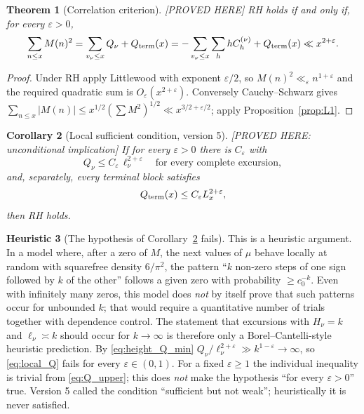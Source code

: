 \documentclass[11pt]{amsart}
\numberwithin{equation}{section}
\theoremstyle{plain}
\newtheorem{theorem}{Theorem}[section]
\newtheorem{corollary}[theorem]{Corollary}
\theoremstyle{definition}
\newtheorem{heuristic}[theorem]{Heuristic}
\theoremstyle{remark}
\newcommand{\eps}{\varepsilon}
\begin{document}
\begin{theorem}[Correlation criterion]
\label{thm:corr-criterion}
\emph{[PROVED HERE]} RH holds if and only if, for every $\eps>0$,
\begin{equation}
\label{eq:RH-corr}
  \sum_{n\le x}M(n)^2=\sum_{v_\nu\le x}Q_\nu+Q_{\rm term}(x)
  =-\sum_{v_\nu\le x}\sum_{h}hC^{(\nu)}_h+Q_{\rm term}(x)\ll x^{2+\eps}.
\end{equation}
\end{theorem}

\begin{proof}
Under RH apply Littlewood with exponent $\eps/2$, so
$M(n)^2\ll_\eps n^{1+\eps}$ and the required quadratic sum is
$O_\eps(x^{2+\eps})$. Conversely Cauchy--Schwarz gives
$\sum_{n\le x}|M(n)|\le x^{1/2}(\sum M^2)^{1/2}\ll x^{3/2+\eps/2}$; apply
Proposition~\ref{prop:L1}.
\end{proof}

\begin{corollary}[Local sufficient condition, version 5]
\label{cor:local-corr-sufficient}
\emph{[PROVED HERE: unconditional implication]} If for every $\eps>0$ there is
$C_\eps$ with
\begin{equation}
\label{eq:local_Q}
  Q_\nu\le C_\eps\,\ell_\nu^{2+\eps}\quad\text{for every complete excursion},
\end{equation}
and, separately, every terminal block satisfies
\[
Q_{\rm term}(x)\le C_\eps L_x^{2+\eps},
\]
then RH holds.
\end{corollary}

\begin{heuristic}[The hypothesis of Corollary~\ref{cor:local-corr-sufficient} fails]
\label{heu:local_fails}
This is a heuristic argument. In a model where, after a zero of $M$, the next
values of $\mu$ behave locally at random with squarefree density $6/\pi^2$,
the pattern ``$k$ non-zero steps of one sign followed by $k$ of the other''
follows a given zero with probability $\ge c_0^{-k}$. Even with infinitely many zeros, this model does \emph{not} by itself
prove that such patterns occur for unbounded $k$; that would require a
quantitative number of trials together with dependence control. The
statement that excursions with $H_\nu=k$ and $\ell_\nu\asymp k$ should
occur for $k\to\infty$ is therefore only a Borel--Cantelli-style
heuristic prediction. By \eqref{eq:height_Q_min}
$Q_\nu/\ell_\nu^{2+\eps}\gg k^{1-\eps}\to\infty$, so \eqref{eq:local_Q}
fails for every $\eps\in(0,1)$.  For a fixed $\eps\ge1$ the individual inequality
is trivial from \eqref{eq:Q_upper}; this does \emph{not} make the hypothesis
``for every $\eps>0$'' true. Version 5 called the condition ``sufficient but
not weak''; heuristically it is never satisfied.
\end{heuristic}
\end{document}

